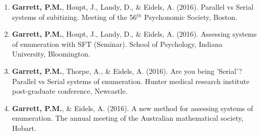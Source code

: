 \documentclass[12pt,oneside]{Thesis}
\begin{document}
{\begin{enumerate}
\item \textbf{Garrett, P.M.}, Houpt, J., Landy, D., \& Eidels, A. (2016). Parallel vs Serial systems of subitizing. Meeting of the 56$^{th}$ Psychonomic Society, Boston.

\item \textbf{Garrett, P.M.}, Houpt, J., Landy, D., \& Eidels, A. (2016). Assessing systems of enumeration with SFT (Seminar). School of Psychology, Indiana University, Bloomington.

\item\textbf{Garrett, P.M.}, Thorpe, A., \& Eidels, A. (2016). Are you being 'Serial'? Parallel vs Serial systems of enumeration. Hunter medical research institute post-graduate conference, Newcastle.

\item \textbf{Garrett, P.M.}, \& Eidels, A. (2016). A new method for assessing systems of enumeration. The annual meeting of the Australian mathematical society, Hobart. 

\end{enumerate}
}

\clearpage
\end{document}
